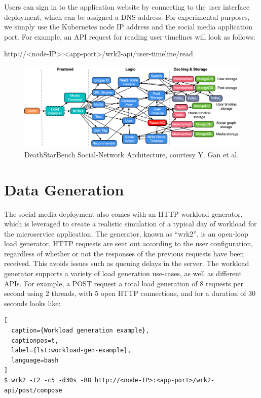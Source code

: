 Users can sign in to the application website by connecting to the user interface deployment, which can be assigned a DNS address. For experimental purposes, we simply use the Kubernetes node IP address and the social media application port. For example, an API request for reading user timelines will look as follows:\par

http://<node-IP>:<app-port>/wrk2-api/user-timeline/read

\begin{figure}[htb]
    \centering
    \caption{DeathStarBench Social-Network Architecture, courtesy Y. Gan et al. \cite{gan2019open}}
    \label{fig:social}
    \includegraphics[width=1.0\linewidth]{Figures/Social-Network-Architecture.pdf}
\end{figure}

\section{Data Generation}
\label{sec:data-generation}

The social media deployment also comes with an HTTP workload generator, which
is leveraged to create a realistic simulation of a typical day of workload for the microservice application. The generator, known as ``wrk2'', is an open-loop load generator. HTTP requests are sent out according to the user configuration, regardless of whether or not the responses of the previous requests have been received. This avoids issues such as queuing delays in the server. The workload generator supports a variety of load generation use-cases, as well as different APIs. For example, a POST request a total load generation of 8 requests per second using 2 threads, with 5 open HTTP connections, and for a duration of 30 seconds looks like:\par

\begin{lstlisting}[
  caption={Workload generation example},
  captionpos=t,
  label={lst:workload-gen-example},
  language=bash
]
$ wrk2 -t2 -c5 -d30s -R8 http://<node-IP>:<app-port>/wrk2-api/post/compose
\end{lstlisting}



